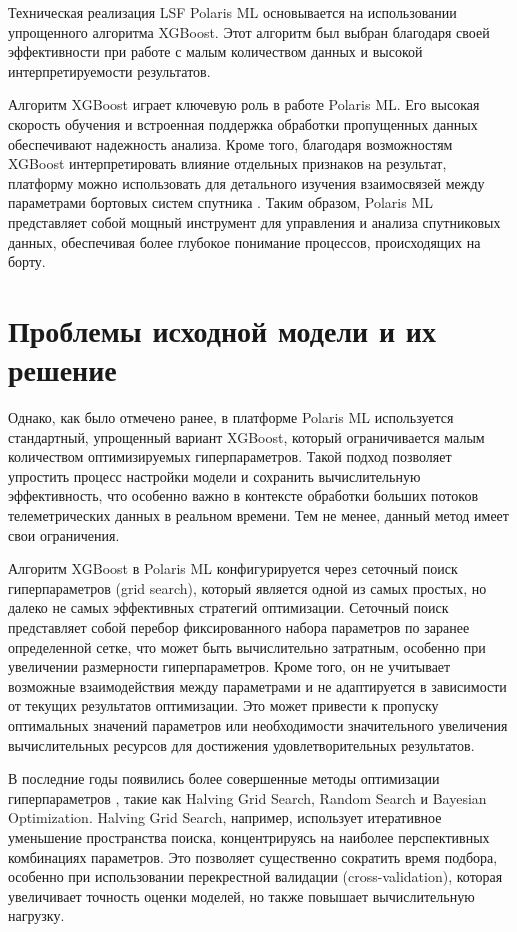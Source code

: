 \documentclass[14pt, a4paper]{bsu}
\begin{document}
Техническая реализация LSF Polaris ML основывается на использовании упрощенного
алгоритма XGBoost. Этот алгоритм был выбран благодаря своей эффективности при
работе с малым количеством данных и высокой интерпретируемости результатов.

Алгоритм XGBoost играет ключевую роль в работе Polaris ML. Его высокая скорость
обучения и встроенная поддержка обработки пропущенных данных обеспечивают
надежность анализа. Кроме того, благодаря возможностям XGBoost интерпретировать
влияние отдельных признаков на результат, платформу можно использовать для
детального изучения взаимосвязей между параметрами бортовых систем спутника
\cite{xgboost_docs}. Таким образом, Polaris ML представляет собой мощный
инструмент для управления и анализа спутниковых данных, обеспечивая более
глубокое понимание процессов, происходящих на борту.

\section{Проблемы исходной модели и их решение}

Однако, как было отмечено ранее, в платформе Polaris ML используется
стандартный, упрощенный вариант XGBoost, который ограничивается малым
количеством оптимизируемых гиперпараметров. Такой подход позволяет упростить
процесс настройки модели и сохранить вычислительную эффективность, что особенно
важно в контексте обработки больших потоков телеметрических данных в реальном
времени. Тем не менее, данный метод имеет свои ограничения.

Алгоритм XGBoost в Polaris ML конфигурируется через сеточный поиск
гиперпараметров (grid search), который является одной из самых простых, но
далеко не самых эффективных стратегий оптимизации. Сеточный поиск представляет
собой перебор фиксированного набора параметров по заранее определенной сетке,
что может быть вычислительно затратным, особенно при увеличении размерности
гиперпараметров. Кроме того, он не учитывает возможные взаимодействия между
параметрами и не адаптируется в зависимости от текущих результатов оптимизации.
Это может привести к пропуску оптимальных значений параметров или необходимости
значительного увеличения вычислительных ресурсов для достижения
удовлетворительных результатов.

В последние годы появились более совершенные методы оптимизации гиперпараметров
\cite{grid_search_tuning}, такие как Halving Grid Search, Random Search и
Bayesian Optimization. Halving Grid Search, например, использует итеративное
уменьшение пространства поиска, концентрируясь на наиболее перспективных
комбинациях параметров. Это позволяет существенно сократить время подбора,
особенно при использовании перекрестной валидации (cross-validation), которая
увеличивает точность оценки моделей, но также повышает вычислительную нагрузку.
\end{document}
